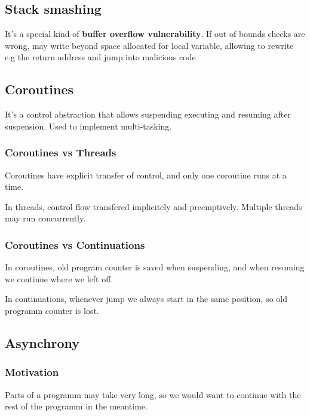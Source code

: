 \documentclass{article}
\begin{document}
\subsection{Stack smashing}
It's a special kind of \textbf{buffer overflow vulnerability}. If out of bounds checks are wrong, may write beyond space allocated for local variable, allowing to rewrite e.g the return address and jump into malicious code

\subsection{Coroutines}
It's a control abstraction that allows suspending executing and resuming after suspension. Used to implement multi-tasking.

\subsubsection{Coroutines vs Threads}
Coroutines have explicit transfer of control, and only one coroutine runs at a time. 

In threads, control flow transfered implicitely and preemptively. Multiple threads may run concurrently.

\subsubsection{Coroutines vs Continuations}
In coroutines, old program counter is saved when suspending, and when resuming we continue where we left off.

In continuations, whenever jump we always start in the same position, so old programm counter is lost.

\subsection{Asynchrony}
\subsubsection{Motivation}
Parts of a programm may take very long, so we would want to continue with the rest of the programm in the meantime.
\end{document}
